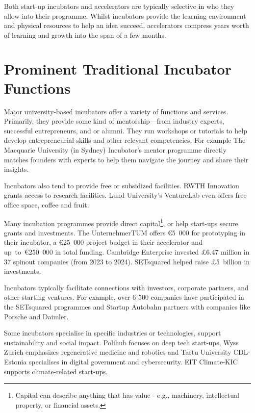 Both start-up incubators and accelerators are typically selective in who they allow into their programme. Whilst incubators provide the learning environment and physical resources to help an idea succeed, accelerators compress years worth of learning and growth into the span of a few months.
\cite{harward-incub-accelerator}

\section{Prominent Traditional Incubator Functions}
Major university-based incubators offer a variety of functions and services. Primarily, they provide some kind of mentorship---from industry experts, successful entrepreneurs, and or alumni. They run workshops or tutorials to help develop entrepreneurial skills and other relevant competencies. For example The Macquarie University (in Sydney) Incubator’s mentor programme directly matches founders with experts to help them navigate the journey and share their insights.
\cite{Bonenkamp_incubators, Macquarie-incubation}

Incubators also tend to provide free or subsidized facilities. RWTH Innovation grants access to research facilities. Lund University’s VentureLab even offers free office space, coffee and fruit.
\cite{rth-innovation, lund-incubator}

Many incubation programmes provide direct capital\footnote{Capital can describe anything that has value - e.g., machinery, intellectual property, or financial assets.}, or help start-ups secure grants and investments. The UnternehmerTUM offers €5~000 for prototyping in their incubator, a €25~000 project budget in their accelerator and up~to~€250~000 in total funding. Cambridge Enterprise invested £6.47 million in 37 spinout companies (from 2023 to 2024). SETsquared helped raise £5~billion in investments.
\cite{unternehmertum, cambridge-venture, setsquared}

Incubators typically facilitate connections with investors, corporate partners, and other starting ventures. For example, over 6 500 companies have participated in the SETsquared programmes and Startup Autobahn partners with companies like Porsche and Daimler.
\cite{setsquared, autobahn}

Some incubators specialise in specific industries or technologies, support sustainability and social impact. Polihub focuses on deep tech start-ups, Wyss Zurich emphasizes regenerative medicine and robotics and Tartu University CDL-Estonia specialises in digital government and cybersecurity. EIT Climate-KIC supports climate-related start-ups.
\cite{polihub, wyss-zurich, estonia-creative-destruction, climate-strategy}

